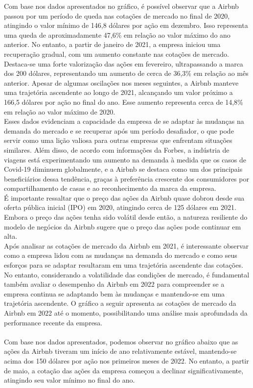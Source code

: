 \documentclass{article}
\begin{document}
Com base nos dados apresentados no gráfico, é possível observar que a Airbnb passou por um período de queda nas cotações de mercado no final de 2020, atingindo o valor mínimo de 146,8 dólares por ação em dezembro. Isso representa uma queda de aproximadamente 47,6\% em relação ao valor máximo do ano anterior. No entanto, a partir de janeiro de 2021, a empresa iniciou uma recuperação gradual, com um aumento constante nas cotações de mercado. Destaca-se uma forte valorização das ações em fevereiro, ultrapassando a marca dos 200 dólares, representando um aumento de cerca de 36,3\% em relação ao mês anterior. Apesar de algumas oscilações nos meses seguintes, a Airbnb manteve uma trajetória ascendente ao longo de 2021, alcançando um valor próximo a 166,5 dólares por ação no final do ano. Esse aumento representa cerca de 14,8\% em relação ao valor máximo de 2020. \\
Esses dados evidenciam a capacidade da empresa de se adaptar às mudanças na demanda do mercado e se recuperar após um período desafiador, o que pode servir como uma lição valiosa para outras empresas que enfrentam situações similares. Além disso, de acordo com informações da Forbes, a indústria de viagens está experimentando um aumento na demanda à medida que os casos de Covid-19 diminuem globalmente, e a Airbnb se destaca como um dos principais beneficiários dessa tendência, graças à preferência crescente dos consumidores por compartilhamento de casas e ao reconhecimento da marca da empresa. \\ 
É importante ressaltar que o preço das ações da Airbnb quase dobrou desde sua oferta pública inicial (IPO) em 2020, atingindo cerca de 125 dólares em 2021. Embora o preço das ações tenha sido volátil desde então, a natureza resiliente do modelo de negócios da Airbnb sugere que o preço das ações pode continuar em alta. \\ 
Após analisar as cotações de mercado da Airbnb em 2021, é interessante observar como a empresa lidou com as mudanças na demanda do mercado e como seus esforços para se adaptar resultaram em uma trajetória ascendente das cotações. No entanto, considerando a volatilidade das condições de mercado, é fundamental também avaliar o desempenho da Airbnb em 2022 para compreender se a empresa continua se adaptando bem às mudanças e mantendo-se em uma trajetória ascendente. O gráfico a seguir apresenta as cotações de mercado da Airbnb em 2022 até o momento, possibilitando uma análise mais aprofundada da performance recente da empresa. \\ \\
Com base nos dados apresentados, podemos observar no gráfico abaixo que as ações da Airbnb tiveram um início de ano relativamente estável, mantendo-se acima dos 150 dólares por ação nos primeiros meses de 2022. No entanto, a partir de maio, a cotação das ações da empresa começou a declinar significativamente, atingindo seu valor mínimo no final do ano.
\end{document}
